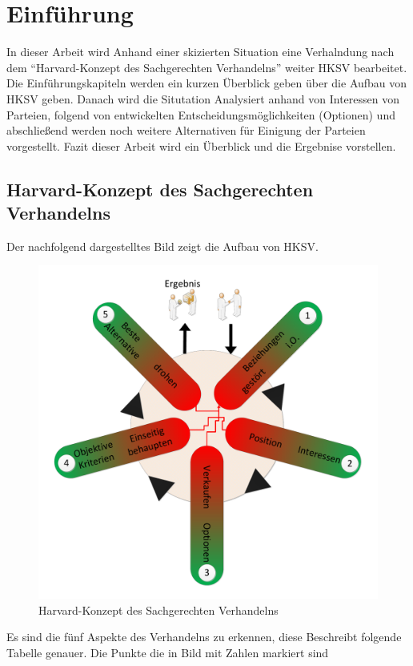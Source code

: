 \chapter{Einführung}
In dieser Arbeit wird Anhand einer skizierten Situation eine Verhalndung nach dem "`Harvard-Konzept des Sachgerechten Verhandelns"'\cite{hk} weiter
HKSV bearbeitet. Die Einführungskapiteln werden ein kurzen Überblick geben über die Aufbau von HKSV\cite{hk} geben. Danach wird die Situtation
Analysiert anhand von Interessen von Parteien, folgend von entwickelten Entscheidungsmöglichkeiten (Optionen) und abschließend werden noch weitere Alternativen für Einigung
der Parteien vorgestellt. Fazit dieser Arbeit wird ein Überblick und die Ergebnise vorstellen.
\section{Harvard-Konzept des Sachgerechten Verhandelns}
Der nachfolgend dargestelltes Bild zeigt die Aufbau von HKSV\cite{hk}.
\begin{figure}[hb]
\centering
\includegraphics[width=0.4\paperwidth]{pictures/Harvard1}
\caption{Harvard-Konzept des Sachgerechten Verhandelns}
\end{figure}
Es sind die fünf Aspekte des Verhandelns zu erkennen, diese Beschreibt folgende Tabelle genauer. Die Punkte die in Bild mit Zahlen markiert sind
